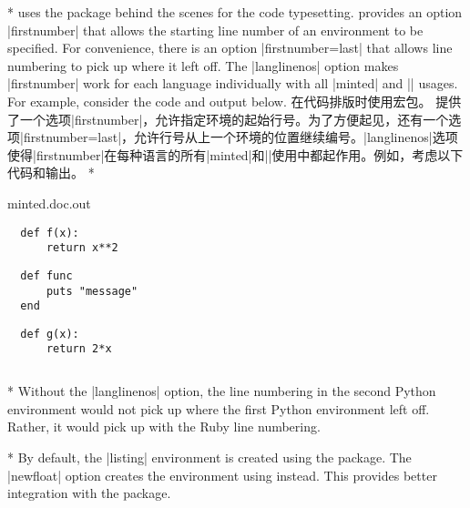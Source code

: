 \begin{paracol}{2}
\switchcolumn[0]*%
 uses the  package behind the scenes for the code typesetting.   provides an option |firstnumber| that allows the starting line number of an environment to be specified.  For convenience, there is an option |firstnumber=last| that allows line numbering to pick up where it left off.  The |langlinenos| option makes |firstnumber| work for each language individually with all |minted| and |\mint| usages.  For example, consider the code and output below.
\switchcolumn
{}
在代码排版时使用宏包。 提供了一个选项|firstnumber|，允许指定环境的起始行号。为了方便起见，还有一个选项|firstnumber=last|，允许行号从上一个环境的位置继续编号。|langlinenos|选项使得|firstnumber|在每种语言的所有|minted|和|\mint|使用中都起作用。例如，考虑以下代码和输出。
\switchcolumn[0]*%
\begin{VerbatimOut}[gobble=1]{minted.doc.out}
  \begin{verbatim}
  def f(x):
      return x**2
  \end{verbatim}

  \begin{verbatim}
  def func
      puts "message"
  end
  \end{verbatim}

  \begin{verbatim}
  def g(x):
      return 2*x
  \end{verbatim}
\end{VerbatimOut}
\inputminted[frame=single, rulecolor=minted@linkcolor]{latex}{minted.doc.out}
\hfill
\colorbox{minted@samplebg}{\begin{minipage}{0.6\textwidth}
  
\end{minipage}}
\hfill\hfill
\switchcolumn

\switchcolumn[0]*%
Without the |langlinenos| option, the line numbering in the second Python environment would not pick up where the first Python environment left off.  Rather, it would pick up with the Ruby line numbering.

\switchcolumn

\switchcolumn[0]*%
By default, the |listing| environment is created using the  package.  The |newfloat| option creates the environment using  instead.  This provides better integration with the  package.


\end{paracol}
